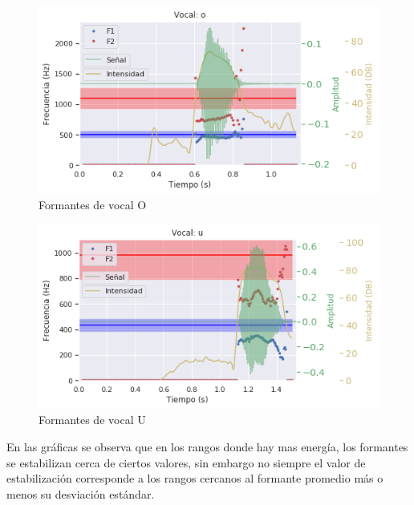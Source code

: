 \begin{figure}[H]
\caption{Formantes de vocal O}
\label{img:formantes_o}
\includegraphics[width=\textwidth]{imagenes/04_02_o.png}
\end{figure}

\begin{figure}[H]
\caption{Formantes de vocal U}
\label{img:formantes_u}
\includegraphics[width=\textwidth]{imagenes/04_02_u.png}
\end{figure}


En las gráficas se observa que en los rangos donde hay mas energía, los formantes se estabilizan cerca de ciertos valores, sin embargo no siempre el valor de estabilización corresponde a los rangos cercanos al formante promedio más o menos su desviación estándar.

